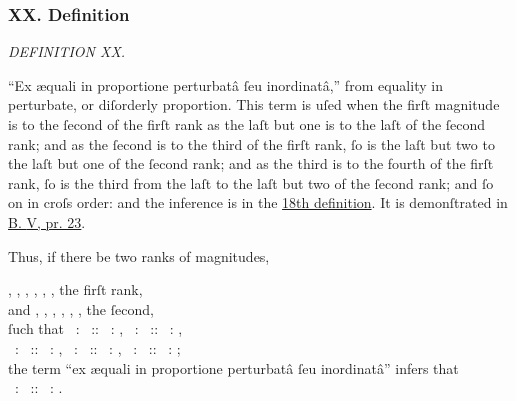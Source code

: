 \documentclass[11pt,preview]{standalone}
\begin{document}
\newcommand{\redA}{{\color{cred}{A}}}
\newcommand{\redB}{{\color{cred}{B}}}
\newcommand{\redP}{{\color{cred}{P}}}
\newcommand{\redQ}{{\color{cred}{Q}}}
\newcommand{\blueC}{{\color{cblue}{C}}}
\newcommand{\blueD}{{\color{cblue}{D}}}
\newcommand{\blueN}{{\color{cblue}{N}}}
\newcommand{\blueO}{{\color{cblue}{O}}}
\newcommand{\yellowE}{{\color{cyellow}{E}}}
\newcommand{\yellowF}{{\color{cyellow}{F}}}
\newcommand{\yellowL}{{\color{cyellow}{L}}}
\newcommand{\yellowM}{{\color{cyellow}{M}}}

\subsubsection{XX. Definition}

\begin{minipage}{\textwidth}

    \begin{center}
        \textit{DEFINITION XX.}\label{book5def20} \\
    \end{center}

    \hfill
\end{minipage}

\raggedright “Ex \ae quali in proportione perturbatâ ſeu inordinatâ,” from equality in perturbate, or diſorderly proportion. This term is uſed when the firſt magnitude is to the ſecond of the firſt rank as the laſt but one is to the laſt of the ſecond rank; and as the ſecond is to the third of the firſt rank, ſo is the laſt but two to the laſt but one of the ſecond rank; and as the third is to the fourth of the firſt rank, ſo is the third from the laſt to the laſt but two of the ſecond rank; and ſo on in croſs order: and the inference is in the \hyperref[book5def18]{18th definition}. It is demonſtrated in \hyperref[book5pr23]{B. \textsc{V}, pr. 23}.

\hfill

Thus, if there be two ranks of magnitudes,\\

\begin{center}
    \redA, \redB, \blueC, \blueD, \yellowE, \yellowF, the firſt rank,\\
    and \yellowL, \yellowM, \blueN, \blueO, \redP, \redQ, the ſecond,\\
    ſuch that \redA\ : \redB\ :: \redP\ : \redQ, \redB\ : \blueC\ :: \blueO\ : \redP,\\
    \blueC\ : \blueD\ :: \blueN\ : \blueO, \blueD\ : \yellowE\ :: \yellowM\ : \blueN, \yellowE\ : \yellowF\ :: \yellowL\ : \yellowM;\\
    the term “ex æquali in proportione perturbatâ ſeu inordinatâ” infers that\\
    \redA\ : \yellowF\ :: \yellowL\ : \redQ.
\end{center}
\end{document}
